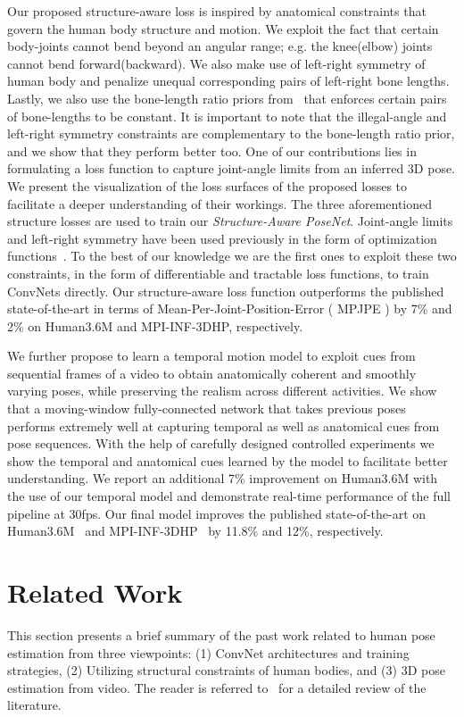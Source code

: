 \documentclass[runningheads]{llncs}
\begin{document}
Our proposed structure-aware loss is inspired by anatomical constraints that govern the human body structure and motion. We exploit the fact that certain body-joints cannot bend beyond an angular range; e.g. the knee(elbow) joints cannot bend forward(backward). We also make use of left-right symmetry of human body and penalize unequal corresponding pairs of left-right bone lengths. Lastly, we also use the bone-length ratio priors from~\cite{Zhou_2017_ICCV} that enforces certain pairs of bone-lengths to be constant. It is important to note that the illegal-angle and left-right symmetry constraints are complementary to the bone-length ratio prior, and we show that they perform better too. One of our contributions lies in formulating a loss function to capture joint-angle limits from an inferred 3D pose. We present the visualization of the loss surfaces of the proposed losses to facilitate a deeper understanding of their workings. The three aforementioned structure losses are used to train our \emph{Structure-Aware PoseNet}. Joint-angle limits and left-right symmetry have been used previously in the form of optimization functions~\cite{akhter2015pose,HERDA2005189,bogo2016keep}. To the best of our knowledge we are the first ones to exploit these two constraints, in the form of differentiable and tractable loss functions, to train ConvNets directly. Our structure-aware loss function outperforms the published state-of-the-art in terms of Mean-Per-Joint-Position-Error ( MPJPE ) by 7\% and 2\% on Human3.6M and MPI-INF-3DHP, respectively.

We further propose to learn a temporal motion model to exploit cues from sequential frames of a video to obtain anatomically coherent and smoothly varying poses, while preserving the realism across different activities. We show that a moving-window fully-connected network that takes previous  poses performs extremely well at capturing temporal as well as anatomical cues from pose sequences. With the help of carefully designed controlled experiments we show the temporal and anatomical cues learned by the model to facilitate better understanding. We report an additional 7\% improvement on Human3.6M with the use of our temporal model and demonstrate real-time performance of the full pipeline at 30fps. Our final model improves the published state-of-the-art on Human3.6M~\cite{h36m_pami} and MPI-INF-3DHP~\cite{mono-3dhp2017} by 11.8\% and 12\%, respectively.

\vspace{-1em}
\section{Related Work} \label{sec:relatedWork}
This section presents a brief summary of the past work related to human pose estimation from three viewpoints: (1) ConvNet architectures and training strategies, (2) Utilizing structural constraints of human bodies, and (3) 3D pose estimation from video. The reader is referred to~\cite{SARAFIANOS20161} for a detailed review of the literature.
\end{document}
